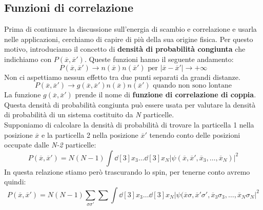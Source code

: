 
\vspace{1.0cm}
\vspace{1.0cm}

\subsection{Funzioni di correlazione}

Prima di continuare la discussione sull'energia di scambio e correlazione e usarla nelle applicazioni, cerchiamo di capire di più della sua origine fisica. Per questo motivo, introduciamo il concetto di \textbf{densità di probabilità congiunta} che indichiamo con $P(\overline x, \overline{x}')$. Queste funzioni hanno il seguente andamento:
\begin{equation*}
    P(\overline x, \overline x') \longrightarrow n(\overline x)n(\overline{x}') \text{ per } |\overline x-\overline{x}'|\rightarrow +\infty
\end{equation*}
Non ci aspettiamo nessun effetto tra due punti separati da grandi distanze.
\begin{equation*}
    P(\overline x, \overline x') \longrightarrow g(\overline x, \overline x')n(\overline x)n(\overline{x}') \text{ quando non sono lontane}
\end{equation*}
La funzione $g(\overline x, \overline x')$ prende il nome di \textbf{funzione di correlazione di coppia}. \\
Questa densità di probabilità congiunta può essere usata per valutare la densità di probabilità di un sistema costituito da \textit{N} particelle.\\
Supponiamo di calcolare la densità di probabilità di trovare la particella 1 nella posizione $\overline x$ e la particella 2 nella posizione $\overline{x}'$ tenendo conto delle posizioni occupate dalle \textit{N-2} particelle:
\begin{equation*}
    P(\overline x, \overline{x}')=N(N-1)\int \dd[3]x_3\dots\dd[3]{x_N} |\psi(\overline x, \overline{x}', \overline{x}_3, \dots, \overline{x}_N)|^2
\end{equation*}
In questa relazione stiamo però trascurando lo spin, per tenerne conto avremo quindi:
\begin{equation*}
    P(\overline x, \overline{x}')=N(N-1)\sum_{\sigma \sigma'}\sum_{}\int \dd[3]{x_3}\dots\dd[3]{x_N}|\psi(\overline x \sigma, \overline{x}'\sigma', \overline{x}_3\sigma_3,\dots,\overline{x}_N\sigma_N|^2
\end{equation*}
